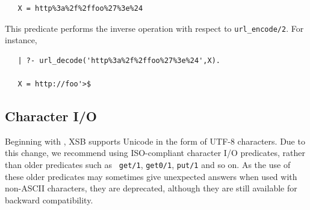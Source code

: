 \begin{description}
\begin{verbatim}
   X = http%3a%2f%2ffoo%27%3e%24
\end{verbatim}

   This predicate performs the inverse operation with respect to 
   \texttt{url\_encode/2}. For instance, 
\begin{verbatim}
   | ?- url_decode('http%3a%2f%2ffoo%27%3e%24',X).

   X = http://foo'>$
\end{verbatim}

\end{description}

\subsection{Character I/O}
Beginning with \version{}, XSB supports Unicode in the form of UTF-8
characters.  Due to this change, we recommend using ISO-compliant
character I/O predicates, rather than older predicates such as {\tt
  get/1}, {\tt get0/1}, {\tt put/1} and so on.  As the use of these
older predicates may sometimes give unexpected answers when used with
non-ASCII characters, they are deprecated, although they are still
available for backward compatibility.

